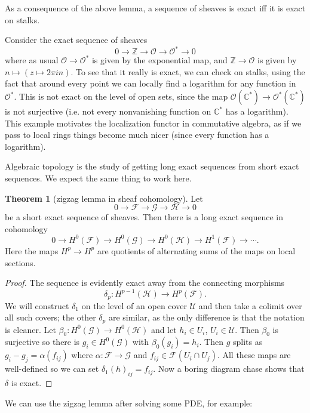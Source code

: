 \documentclass[12pt]{book}
\newcommand{\ZZ}{\mathbb{Z}}
\newcommand{\CC}{\mathbb{C}}
\newcommand{\Olo}{\mathscr O}
\theoremstyle{definition}
\newtheorem{theorem}{Theorem}[chapter]
\newenvironment{example}
  {\pushQED{\qed}\renewcommand{\qedsymbol}{$\diamondsuit$}\examplex}
  {\popQED\endexamplex}
\begin{document}
As a consequence of the above lemma, a sequence of sheaves is exact iff it is exact on stalks.

\begin{example}
Consider the exact sequence of sheaves
$$0 \to \ZZ \to \Olo \to \Olo^* \to 0$$
where as usual $\Olo \to \Olo^*$ is given by the exponential map, and $\ZZ \to \Olo$ is given by $n \mapsto (z \mapsto 2\pi in)$.
To see that it really is exact, we can check on stalks, using the fact that around every point we can locally find a logarithm for any function in $\Olo^*$.
This is not exact on the level of open sets, since the map $\Olo(\CC^*) \to \Olo^*(\CC^*)$ is not surjective (i.e. not every nonvanishing function on $\CC^*$ has a logarithm).
This example motivates the localization functor in commutative algebra, as if we pass to local rings things become much nicer (since every function has a logarithm).
\end{example}

Algebraic topology is the study of getting long exact sequences from short exact sequences.
We expect the same thing to work here.

\begin{theorem}[zigzag lemma in sheaf cohomology]
Let
$$0 \to \mathscr F \to \mathscr G \to \mathscr H \to 0$$
be a short exact sequence of sheaves. Then there is a long exact sequence in cohomology
$$0 \to H^0(\mathscr F) \to H^0(\mathscr G) \to H^0(\mathscr H) \to H^1(\mathscr F) \to \cdots.$$
Here the maps $H^p \to H^p$ are quotients of alternating sums of the maps on local sections.
\end{theorem}
\begin{proof}
The sequence is evidently exact away from the connecting morphisms
$$\delta_p: H^{p-1}(\mathscr H) \to H^p(\mathscr F).$$
We will construct $\delta_1$ on the level of an open cover $\mathcal U$ and then take a colimit over all such covers; the other $\delta_p$ are similar, as the only difference is that the notation is cleaner.
Let $\beta_0: H^0(\mathscr G) \to H^0(\mathscr H)$ and let $h_i \in U_i$, $U_i \in \mathscr U$.
Then $\beta_0$ is surjective so there is $g_i \in H^0(\mathscr G)$ with $\beta_0(g_i) = h_i$.
Then $g$ splits as $g_i - g_j = \alpha(f_{ij})$ where $\alpha: \mathscr F \to \mathscr G$ and $f_{ij} \in \mathscr F(U_i \cap U_j)$.
All these maps are well-defined so we can set $\delta_1(h)_{ij} = f_{ij}$.
Now a boring diagram chase shows that $\delta$ is exact.
\end{proof}

We can use the zigzag lemma after solving some PDE, for example:
\end{document}
